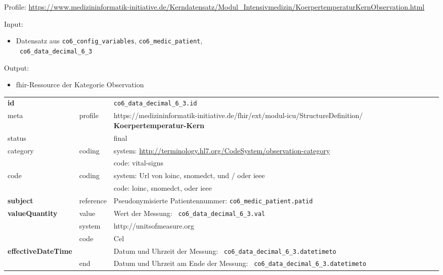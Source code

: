 \noindent Profile: \url{https://www.medizininformatik-initiative.de/Kerndatensatz/Modul_Intensivmedizin/KoerpertemperaturKernObservation.html}

\noindent Input:
\begin{itemize}
	\item Datensatz aus \texttt{co6\_config\_variables}, \texttt{co6\_medic\_patient}, \\ \texttt{
co6\_data\_decimal\_6\_3}
\end{itemize}
Output:
\begin{itemize}
        \item \ac{fhir}-Ressource der Kategorie \glqq Observation\grqq{}
\end{itemize}
\begin{longtable}{|l|l|p{7.5cm}|}
        \hline
        \rowcolor{lightgray} \multicolumn{3}{|l|}{Data Mapping (inhaltlich)} \\ \hline
        \textbf{id} &  & \texttt{co6\_data\_decimal\_6\_3.id} \\ \hline
	meta & profile & https://medizininformatik-initiative.de/fhir/ext/modul-icu/StructureDefinition/\textbf{
Koerpertemperatur-Kern} \\ \hline 
	status &  & final   \\ \hline 
	category & coding & system: \url{http://terminology.hl7.org/CodeSystem/observation-category} \\
\cline{3-3}
	& & code: vital-signs \\ \hline
	code & coding & system: Url von \ac{loinc}, \ac{snomedct}, und / oder \ac{ieee} \\ 
	\cline{3-3} 
	 &  & code: \ac{loinc}, \ac{snomedct}, oder \ac{ieee} \\ \hline
	 \textbf{subject}  & reference & Pseudonymisierte Patientennummer: \texttt{co6\_medic\_patient.patid} \\ \hline
	 \textbf{valueQuantity}  & value & Wert der Messung: \texttt{
co6\_data\_decimal\_6\_3.val} \\
        \cline{2-3}
         & system & http://unitsofmeasure.org \\
         \cline{2-3}
         & code & Cel \\ \hline
     \textbf{effectiveDateTime}  & & Datum und Uhrzeit der Messung: \texttt{
co6\_data\_decimal\_6\_3.datetimeto} \\
    \cline{2-3}
     & end & Datum und Uhrzeit am Ende der Messung: \texttt{
co6\_data\_decimal\_6\_3.datetimeto} \\ \hline
\end{longtable}


